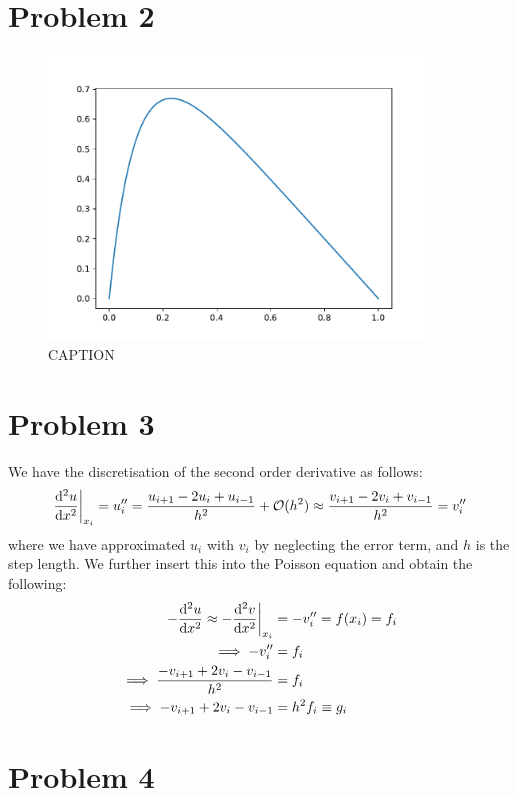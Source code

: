 \documentclass[english,notitlepage]{revtex4-1}  %
\begin{document}
\section*{Problem 2}
\begin{figure}[h!]
    \centering
    \includegraphics[width=0.9\textwidth]{u_x.pdf}
    \caption{CAPTION}
\end{figure}

\section*{Problem 3}
    We have the discretisation of the second order derivative as follows:
    \begin{align*}
        \dv[2]{u}{x}\bigg\rvert_{x_i} = u_i'' = \frac{u_{i+1}-2u_i+u_{i-1}}{h^2} + \mathcal{O}(h^2) \approx \frac{v_{i+1}-2v_i+v_{i-1}}{h^2} = v_i''
    \end{align*}
    where we have approximated $u_i$ with $v_i$ by  neglecting the error term, and $h$ is the step length. We further insert this  into the Poisson equation  and obtain the following:
    \begin{align*}
        -\dv[2]{u}{x}\approx - \dv[2]{v}{x}\bigg\rvert_{x_i} &= -v_i'' = f(x_i) = f_i \\
        \implies -v_i'' &= f_i \\
        \implies \frac{-v_{i+1}+2v_i-v_{i-1}}{h^2} &= f_i \\
        \implies -v_{i+1}+2v_i-v_{i-1} &= h^2f_i \equiv g_i
    \end{align*}





\section*{Problem 4}
\end{document}
